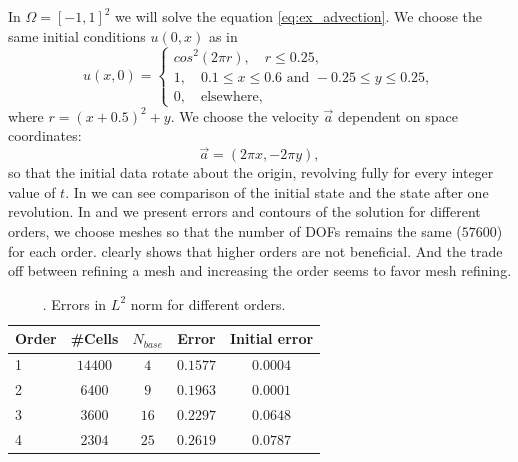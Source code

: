\begin{example}[Advection 2D]
    \label{ex:adv2D_kriv}
    In $\Omega = [-1, 1]^2$ we will solve the equation \eqref{eq:ex_advection}.
    We choose the same initial conditions $u(0, x)$ as in \cite{Krivodonova2007}
    \begin{equation}
        u(x, 0) =\begin{cases}
        cos^2(2\pi r), \quad r \leq 0.25,\\
        1, \quad 0.1 \leq x \leq 0.6 \mbox{ and } -0.25 \leq y \leq 0.25,\\
        0, \quad \mathrm{elsewhere},
        \end{cases}
    \end{equation}
    where $r = (x + 0.5)^2 + y$. We choose the velocity $\vec{a}$ dependent on space
    coordinates:
    $$
    \vec{a} = (2\pi x, -2\pi y),
    $$
    so that the initial data rotate about the origin, revolving fully for every integer
    value of $t$. In  we can see comparison of the initial state and
    the state after one revolution. In  and  we
    present errors and contours of the solution for different orders, we choose meshes so
    that the number of DOFs remains the same ($57600$) for each order.
     clearly shows that higher orders are not beneficial. And the
    trade off between refining a mesh and increasing the order seems to favor mesh
    refining.
    \begin{table}[p!]
        \centering
        \caption{. Errors in $L^2$ norm for different orders.}
        \label{tab:errs_adv2D}
        \begin{tabular}{lcccc}
            \toprule
            Order & \#Cells & $N_{base}$ & Error & Initial error \\
            \midrule
            1&$14400$&$ 4$&$0.1577$&$0.0004$\\
            2&$6400 $&$ 9$&$0.1963$&$0.0001$\\
            3&$3600 $&$16$&$0.2297$&$0.0648$\\
            4&$2304 $&$25$&$0.2619$&$0.0787$\\
            \bottomrule
        \end{tabular}
    \end{table}
\end{example}

